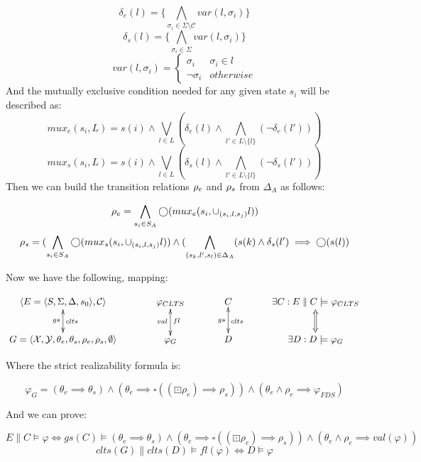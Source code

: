 \[\delta_e(l) = \{\bigwedge_{\sigma_i \in \Sigma \setminus \mathcal{C}}var(l, \sigma_i)\}\]
\[\delta_s(l) = \{\bigwedge_{\sigma_i \in \Sigma}var(l, \sigma_i)\}\]
\[
var(l, \sigma_i) = \begin{cases}
\sigma_i & \sigma_i \in l \\
\neg \sigma_i & otherwise
\end{cases}
\]
And the mutually exclusive condition needed for any given state $s_i$ will be described as:
\[mux_e(s_i,L) = s(i) \wedge \bigvee_{l \in L}(\delta_e(l) \wedge \bigwedge_{l' \in L \setminus \{l\}}(\neg \delta_e(l')) ) \]
\[mux_s(s_i,L) = s(i) \wedge \bigvee_{l \in L}(\delta_s(l) \wedge \bigwedge_{l' \in L \setminus \{l\}}(\neg \delta_s(l')) ) \]
Then we can build the transition relations ${\rho_e}$ and ${\rho_s}$ from $\Delta_A$ as follows:

\[ {\rho_e} = \bigwedge_{s_i \in S_A} \bigcirc(mux_e(s_i,\cup_{(s_i,l,s_j)}l))\]
\[ {\rho_s} = (\bigwedge_{s_i \in S_A} \bigcirc(mux_s(s_i,\cup_{(s_i,l,s_j)}l)) \wedge (\bigwedge_{(s_k,l',s_l) \in \Delta_A} (s(k) \wedge \delta_s(l') \implies \bigcirc(s(l))\]

Now we have the following, mapping:

\[\xymatrix@C+1pc{
	\langle E = \langle S, \Sigma, \Delta, s_0 \rangle, \mathcal{C} \rangle \ar@{<->}[d]^{clts}_{gs}
	& \varphi_{CLTS}\ar@{<->}[d]^{fl}_{val}
	& C\ar@{<->}[d]^{clts}_{gs}
	& \exists C: E\parallel C \models  \varphi_{CLTS}\ar@{<=>}[d]\\
	G = \langle \mathcal{X},\mathcal{Y},\theta_e,\theta_s,\rho_e,\rho_s, \emptyset \rangle
	& \varphi_G
	& D
	&\exists D: D \models \varphi_G\\
}\]

Where the strict realizability formula is:

\[\varphi_G = (\theta_e \implies \theta_s) \wedge (\theta_e \implies \square((\boxdot \rho_e) \implies \rho_s)) \wedge (\theta_e \wedge \rho_e \implies \varphi_{FDS}) \]

And we can prove:

\[E\parallel C \models  \varphi \iff gs(C) \models (\theta_e \implies \theta_s) \wedge (\theta_e \implies \square((\boxdot \rho_e) \implies \rho_s)) \wedge (\theta_e \wedge \rho_e \implies val(\varphi))
 \]
\[clts(G) \parallel clts(D) \models  fl(\varphi) \iff D \models \varphi \]